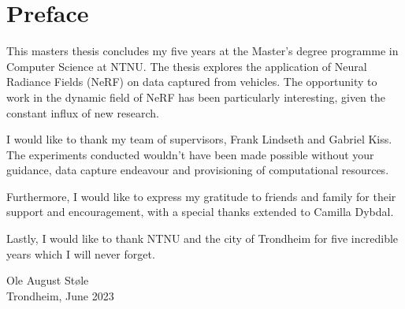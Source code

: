 \chapter*{Preface}

This masters thesis concludes my five years at the Master’s degree programme in Computer Science at NTNU. The thesis explores the application of Neural Radiance Fields (NeRF) on data captured from vehicles. The opportunity to work in the dynamic field of NeRF has been particularly interesting, given the constant influx of new research.

I would like to thank my team of supervisors, Frank Lindseth and Gabriel Kiss. The experiments conducted wouldn't have been made possible without your guidance, data capture endeavour and provisioning of computational resources.

Furthermore, I would like to express my gratitude to friends and family for their support and encouragement, with a special thanks extended to Camilla Dybdal. 

Lastly, I would like to thank NTNU and the city of Trondheim for five incredible years which I will never forget.

\vspace{2.5cm}
\begin{center}
    Ole August Støle \\
    Trondheim, June 2023
\end{center}